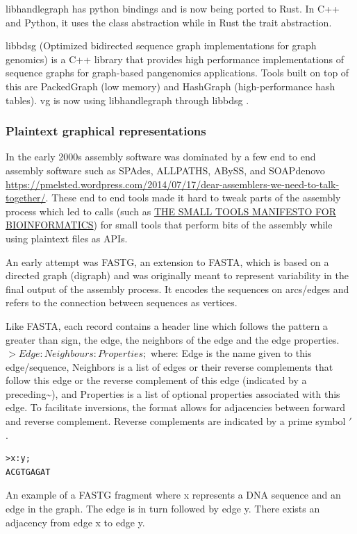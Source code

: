 \documentclass[10pt, a4paper]{article}
\begin{document}
libhandlegraph has python bindings and is now being ported to Rust. In C++ and
Python, it uses the class abstraction while in Rust the trait abstraction.

libbdsg (Optimized bidirected sequence graph implementations for graph genomics)
is a C++ library that provides high performance implementations of sequence
graphs for graph-based pangenomics applications. Tools built on top of this are
PackedGraph (low memory) and HashGraph (high-performance hash tables).
vg is now using libhandlegraph through libbdsg
\cite{eizengaSuccinctDynamicVariation2020}.

\subsubsection{Plaintext graphical representations}
\label{sec:orgb3fc893}
In the early 2000s assembly software was dominated by a few end to end assembly
software such as SPAdes, ALLPATHS, ABySS, and SOAPdenovo
\url{https://pmelsted.wordpress.com/2014/07/17/dear-assemblers-we-need-to-talk-together/}.
These end to end tools made it hard to tweak parts of the assembly process which
led to calls (such as \href{https://github.com/pjotrp/bioinformatics\#the-small-tools-manifesto-for-bioinformatics}{THE SMALL TOOLS MANIFESTO FOR BIOINFORMATICS}) for small
tools that perform bits of the assembly while using plaintext files as APIs.

An early attempt was FASTG,  an extension to FASTA, which is based on a directed
graph (digraph) and was originally meant to represent variability in the final
output of the assembly process.
It encodes the sequences on arcs/edges and refers to the connection
between sequences as vertices.

Like FASTA, each record contains a header line which follows the pattern
a greater than sign, the edge, the neighbors of the edge and the edge properties.
\(>Edge:Neighbours:Properties;\) where: Edge is the name given to this
edge/sequence, Neighbors is a list of edges or their reverse complements that
follow this edge or the reverse complement of this edge
(indicated by a preceding\textasciitilde{}), and Properties is a list of optional properties
associated with this edge. To facilitate
inversions, the format allows for adjacencies between forward and reverse
complement. Reverse complements are indicated by a prime symbol \('\)
.


\begin{verbatim}
>x:y;
ACGTGAGAT
\end{verbatim}
An example of a FASTG fragment where x represents
a DNA sequence and an edge in the graph. The edge is in turn followed by edge y.
There exists an adjacency from edge x to edge y.
\end{document}
